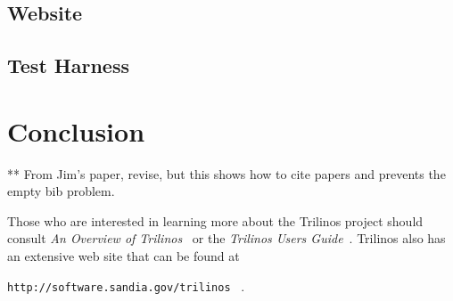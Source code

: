 \documentclass[12pt,relax]{article}
\newcommand{\InlineDirectory}[1]{
  {\hspace{0.01 in}} {\tt #1} {\hspace{0.01 in}}}
\begin{document}
\subsection{Website}

\subsection{Test Harness}

\clearpage


\section{Conclusion}
\label{Section:Conclusion}

\clearpage


** From Jim's paper, revise, but this shows how to cite papers and prevents the
empty bib problem.

Those who are interested in learning more about the Trilinos project should 
consult {\it An Overview of Trilinos}~\cite{Trilinos-Overview} or the
{\it Trilinos Users Guide}~\cite{Trilinos-Users-Guide}.  Trilinos also has an 
extensive web site that can be found at \newline
\InlineDirectory{http://software.sandia.gov/trilinos}~\cite{Trilinos-home-page}.

\clearpage



%

\end{document}
